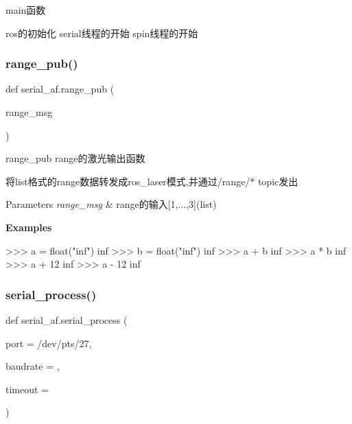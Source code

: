 main函数 

ros的初始化 serial线程的开始 spin线程的开始 \mbox{\label{namespaceserial__af_aabbd1e43de1cd4d1a46a61a1cb743e12}} 
\subsubsection{\texorpdfstring{range\+\_\+pub()}{range\_pub()}}
{\footnotesize\ttfamily def serial\+\_\+af.\+range\+\_\+pub (\begin{DoxyParamCaption}\item[{}]{range\+\_\+msg }\end{DoxyParamCaption})}



range\+\_\+pub range的激光输出函数 

将list格式的range数据转发成ros\+\_\+laser模式,并通过/range/$\ast$ topic发出


\begin{DoxyParams}{Parameters}
{\em range\+\_\+msg} & range的输入\mbox{[}1,...,3\mbox{]}(list)\\
\hline
\end{DoxyParams}
{\bfseries Examples} 
\begin{DoxyCode}
>>> a = float(\textcolor{stringliteral}{"inf"})
inf
>>> b = float(\textcolor{stringliteral}{"inf"})
inf
>>> a + b
inf
>>> a * b
inf
>>> a + 12
inf
>>> a - 12
inf
\end{DoxyCode}
 \mbox{\label{namespaceserial__af_aa88a0e49ebc995801b7957de5f840495}} 
\subsubsection{\texorpdfstring{serial\+\_\+process()}{serial\_process()}}
{\footnotesize\ttfamily def serial\+\_\+af.\+serial\+\_\+process (\begin{DoxyParamCaption}\item[{}]{port = {\ttfamily \textquotesingle{}/dev/pts/27\textquotesingle{}},  }\item[{}]{baudrate = {},  }\item[{}]{timeout = {} }\end{DoxyParamCaption})}



